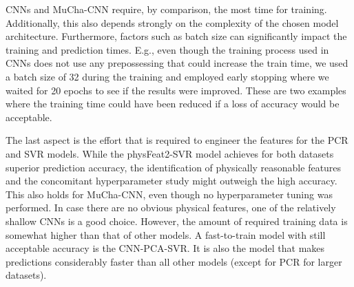 \documentclass[11pt, authoryear]{elsarticle}
\begin{document}
	CNNs and MuCha-CNN require, by comparison, the most time for training.
	Additionally, this also depends strongly on the complexity of the chosen 
	model architecture. Furthermore, factors such as batch size can significantly 
	impact the training and prediction times. E.g., even though the training process 
	used in CNNs does not use any prepossessing that could increase the train
	time, we used a batch size of 32 during the training and employed early 
	stopping where we waited for 20 epochs to see if the results were improved.
	These are two examples where the training time could have been reduced 
        if a loss of accuracy would be acceptable.
	
	The last aspect is the effort that is required to engineer the features for 
	the PCR and  SVR models. While the physFeat2-SVR model achieves for both 
	datasets superior prediction accuracy, the identification of physically 
	reasonable features and the concomitant hyperparameter study might outweigh 
	the high accuracy. This also holds for MuCha-CNN, even though no 
	hyperparameter tuning was performed. In case there are no obvious physical features, one of the 
	relatively shallow CNNs is a good choice. However, the amount of required 
	training data is somewhat higher than that of other models. A fast-to-train
        model with still acceptable accuracy is the CNN-PCA-SVR. It is also the model
	that makes predictions considerably faster than all other models (except for 
	PCR for larger datasets).
\end{document}
